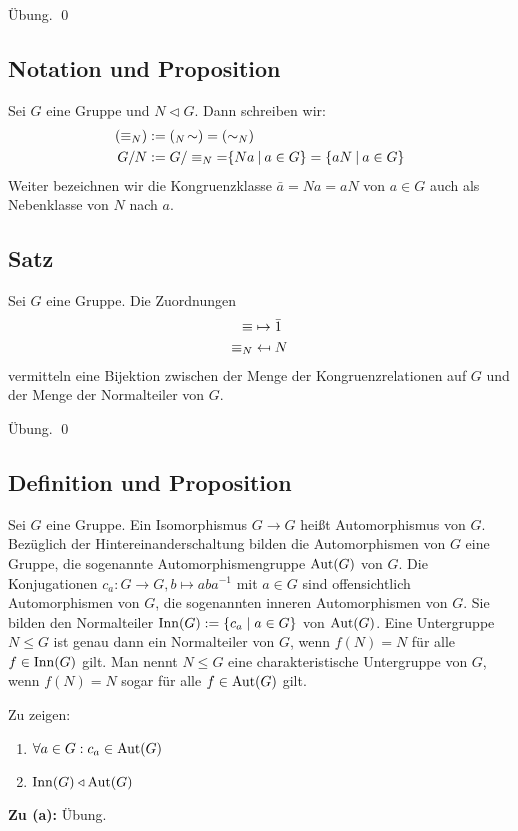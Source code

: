 \proof Übung. \qed
	
\subsection{Notation und Proposition} Sei $G$ eine Gruppe und $N \triangleleft G$. Dann schreiben wir:
\begin{align*}
	(\equiv_N) &:= (\mathrel{{}_N\!\sim}) = (\mathrel{\sim_N}) \\
	G/N &:= G/\equiv_N {=} \{Na\:|\: a\in G\} =\{aN\:|\: a\in G\}
\end{align*}
Weiter bezeichnen wir die Kongruenzklasse $\bar{a}=Na=aN$ von $a \in G$ auch als Nebenklasse von $N$ nach $a$.

\subsection{Satz} Sei $G$ eine Gruppe. Die Zuordnungen
\begin{align*}
	\equiv & \mapsto \bar{1}\\
	\equiv_N & \mathrel{\reflectbox{$\mapsto$}} N
\end{align*}
vermitteln eine Bijektion zwischen der Menge der Kongruenzrelationen auf $G$ und der Menge der Normalteiler von $G$.

\proof Übung. \qed

\subsection{Definition und Proposition}
Sei $G$ eine Gruppe. Ein Isomorphismus $G \to G$ heißt Automorphismus von $G$. Bezüglich der Hintereinanderschaltung bilden die Automorphismen von $G$ eine Gruppe, die sogenannte Automorphismengruppe $\operatorname{Aut}(G)$ von $G$. Die Konjugationen $c_a : G \to G, b \mapsto aba^{-1}$ mit $a \in G$ sind offensichtlich Automorphismen von $G$, die sogenannten inneren Automorphismen von $G$. Sie bilden den Normalteiler $\operatorname{Inn}(G):= \{c_a \mid a \in G \}$ von $\operatorname{Aut}(G)$. Eine Untergruppe $N \leq G$ ist genau dann ein Normalteiler von $G$, wenn $f(N)=N$ für alle $f \in \operatorname{Inn}(G)$ gilt. Man nennt $N\leq G$ eine charakteristische Untergruppe von $G$, wenn $f(N)=N$ sogar für alle $f \in \operatorname{Aut}(G)$ gilt.

\proof Zu zeigen:
\begin{enumerate}[label={\alph*)}]
	\item $\forall a \in G: c_a \in \operatorname{Aut}(G)$
	\item $\operatorname{Inn}(G)\triangleleft \operatorname{Aut}(G)$	
\end{enumerate}
\textbf{Zu (a):} Übung.


